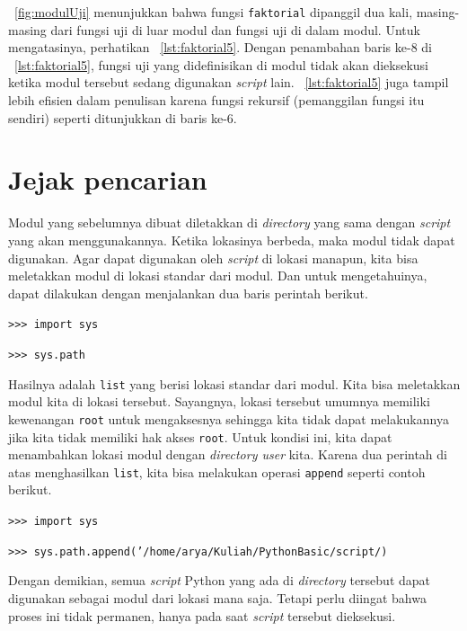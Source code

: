 \figurename~\ref{fig:modulUji} menunjukkan bahwa fungsi \texttt{faktorial} dipanggil dua kali, masing-masing dari fungsi uji di luar modul dan fungsi uji di dalam modul. Untuk mengatasinya, perhatikan \lstlistingname~\ref{lst:faktorial5}. Dengan penambahan baris ke-8 di \lstlistingname~\ref{lst:faktorial5}, fungsi uji yang didefinisikan di modul tidak akan dieksekusi ketika modul tersebut sedang digunakan \textit{script} lain. \lstlistingname~\ref{lst:faktorial5} juga tampil lebih efisien dalam penulisan karena fungsi rekursif (pemanggilan fungsi itu sendiri) seperti ditunjukkan di baris ke-6.



\section{Jejak pencarian}
Modul yang sebelumnya dibuat diletakkan di \textit{directory} yang sama dengan \textit{script} yang akan menggunakannya. Ketika lokasinya berbeda, maka modul tidak dapat digunakan. Agar dapat digunakan oleh \textit{script} di lokasi manapun, kita bisa meletakkan modul di lokasi standar dari modul. Dan untuk mengetahuinya, dapat dilakukan dengan menjalankan dua baris perintah berikut.

\texttt{>>> import sys}

\texttt{>>> sys.path}

Hasilnya adalah \texttt{list} yang berisi lokasi standar dari modul. Kita bisa meletakkan modul kita di lokasi tersebut. Sayangnya, lokasi tersebut umumnya memiliki kewenangan \texttt{root} untuk mengaksesnya sehingga kita tidak dapat melakukannya jika kita tidak memiliki hak akses \texttt{root}. Untuk kondisi ini, kita dapat menambahkan lokasi modul dengan \textit{directory user} kita. Karena dua perintah di atas menghasilkan \texttt{list}, kita bisa melakukan operasi \texttt{append} seperti contoh berikut.

\texttt{>>> import sys}

\texttt{>>> sys.path.append('/home/arya/Kuliah/PythonBasic/script/)}

Dengan demikian, semua \textit{script} Python yang ada di \textit{directory} tersebut dapat digunakan sebagai modul dari lokasi mana saja. Tetapi perlu diingat bahwa proses ini tidak permanen, hanya pada saat \textit{script} tersebut dieksekusi.
